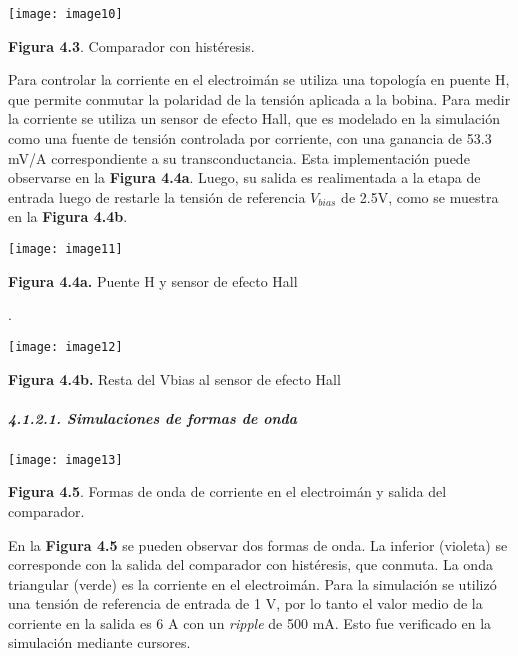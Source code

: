\documentclass{article} %
\begin{document}
\noindent 

\noindent \texttt{[image: image10]}

\noindent \textbf{Figura 4.3}. Comparador con hist\'{e}resis.

\noindent 

\noindent Para controlar la corriente en el electroim\'{a}n se utiliza una topolog\'{i}a en puente H, que permite conmutar la polaridad de la tensi\'{o}n aplicada a la bobina. Para medir la corriente se utiliza un sensor de efecto Hall, que es modelado en la simulaci\'{o}n como  una fuente de tensi\'{o}n controlada por corriente, con una ganancia de 53.3 mV/A correspondiente a su transconductancia. Esta implementaci\'{o}n puede observarse en la \textbf{Figura 4.4a}. Luego, su salida es realimentada a la etapa de entrada luego de restarle la tensi\'{o}n de referencia  $V_{bias}$ de 2.5V, como se muestra en la \textbf{Figura 4.4b}. 

\noindent 

\noindent \texttt{[image: image11]}

\noindent \textbf{Figura 4.4a. }Puente H y sensor de efecto Hall

\noindent .

\noindent \texttt{[image: image12]}

\noindent \textbf{Figura 4.4b. }Resta del Vbias al sensor de efecto Hall

\noindent 

\noindent 

\noindent 
\subparagraph{4.1.2.1. Simulaciones de formas de onda}

\noindent 

\noindent \texttt{[image: image13]}

\noindent \textbf{Figura 4.5}. Formas de onda de corriente en el electroim\'{a}n y salida del comparador.

\noindent 

\noindent En la \textbf{Figura 4.5} se pueden observar dos formas de onda. La inferior (violeta) se corresponde con la salida del comparador con hist\'{e}resis, que conmuta. La onda triangular (verde) es la corriente en el electroim\'{a}n. Para la simulaci\'{o}n se utiliz\'{o} una tensi\'{o}n de referencia de entrada de 1 V, por lo tanto el valor medio de la corriente en la salida es 6 A con un \textit{ripple }de 500 mA. Esto fue verificado en la simulaci\'{o}n mediante cursores.
\end{document}
